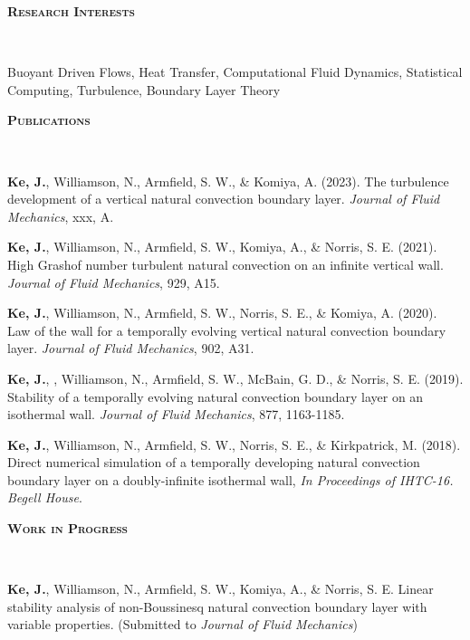 \documentclass[letterpaper, 10pt]{article}
\newenvironment{changemargin}[2]{%
  \begin{list}{}{%
      \setlength{\topsep}{0pt}%
      \setlength{\leftmargin}{#1}%
      \setlength{\rightmargin}{#2}%
      \setlength{\listparindent}{\parindent}%
      \setlength{\itemindent}{\parindent}%
      \setlength{\parsep}{\parskip}%
    }%
  \item[]}{\end{list}
}
\newcommand{\lineover}{
  \begin{changemargin}{-0.05in}{-0.05in}
    \vspace*{-8pt}
    \hrulefill \\
    \vspace*{-2pt}
  \end{changemargin}
}
\newcommand{\header}[1]{
  \begin{changemargin}{-0.5in}{-0.5in}
    \textbf{\scshape{#1}}\\
    \lineover
  \end{changemargin}
}
\newenvironment{body} {
  \vspace*{-16pt}
  \begin{changemargin}{-0.25in}{-0.5in}
  }
  {\end{changemargin}
}
\begin{document}
\header{Research Interests}
Buoyant Driven Flows, Heat Transfer, Computational Fluid Dynamics, Statistical Computing, Turbulence, Boundary Layer Theory
\smallskip



\header{Publications}
\begin{body}
  \vspace{14pt}
    
  \textbf{Ke, J.}, Williamson, N., Armfield, S. W., \& Komiya, A. (2023).  The turbulence development of a vertical natural convection boundary layer. \emph{Journal of Fluid Mechanics}, xxx, A.
  
  \smallskip
  
  \textbf{Ke, J.}, Williamson, N., Armfield, S. W., Komiya, A., \& Norris, S. E. (2021).  High Grashof number turbulent natural convection on an infinite vertical wall. \emph{Journal of Fluid Mechanics}, 929, A15.
  
  \smallskip
  
  \textbf{Ke, J.}, Williamson, N., Armfield, S. W., Norris, S. E., \& Komiya, A.  (2020). Law of the wall for a temporally evolving vertical natural convection boundary layer. \emph{Journal of Fluid Mechanics}, 902, A31.
  
  \smallskip

  \textbf{Ke, J.}, , Williamson, N., Armfield, S. W., McBain, G. D., \& Norris, S. E. (2019). Stability of a temporally evolving natural convection boundary layer on an isothermal wall. \emph{Journal of Fluid Mechanics}, 877, 1163-1185.

  \smallskip

  \textbf{Ke, J.}, Williamson, N., Armfield, S. W., Norris, S. E., \& Kirkpatrick, M. (2018). Direct numerical simulation of a temporally developing natural convection boundary layer on a doubly-infinite isothermal wall, \emph{In Proceedings of IHTC-16. Begell House}. %
  

\end{body}
\smallskip


\header{Work in Progress}
\begin{body}
  \vspace{14pt}

  \textbf{Ke, J.}, Williamson, N., Armfield, S. W., Komiya, A., \& Norris, S. E.  Linear stability analysis of non-Boussinesq natural convection boundary layer with variable properties. (Submitted to \emph{Journal of Fluid Mechanics})
\end{body}
\smallskip
\end{document}
